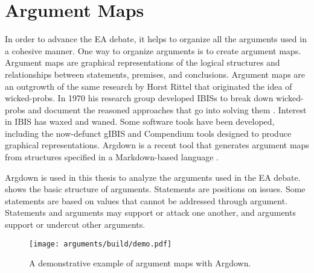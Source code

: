 \section{Argument Maps}
\label{sec-arg-maps-intro}

In order to advance the \ac{EA} debate, it helps to organize all the arguments used in a cohesive manner. One way to
organize arguments is to create argument maps. Argument maps are graphical representations of the logical structures and
relationships between statements, premises, and conclusions. Argument maps are an outgrowth of the same research by
Horst Rittel that originated the idea of \acp{wicked-prob}. In 1970 his research group developed \acp{IBIS} to break
down \acp{wicked-prob} and document the reasoned approaches that go into solving them \cite{kunz_issues_1970}. Interest
in \ac{IBIS} has waxed and waned. Some software tools have been developed, including the now-defunct gIBIS
\cite{conklin_gibis_1988} and Compendium \cite{dutoit_hypermedia_2006} tools designed to produce graphical
representations. Argdown is a recent tool that generates argument maps from structures specified in a Markdown-based
language \cite{voigt_argdown_2018}.

Argdown is used in this thesis to analyze the arguments used in the \ac{EA} debate.  shows the
basic structure of arguments. Statements are positions on issues. Some statements are based on values that cannot be
addressed through argument. Statements and arguments may support or attack one another, and arguments support or
undercut other arguments.

\begin{figure}[ht]
    \centering\CaptionFontSize
    \texttt{[image: arguments/build/demo.pdf]}
    \caption[Argdown Demo]{A demonstrative example of argument maps with Argdown.}
    \label{fig-args-demo}
\end{figure}




